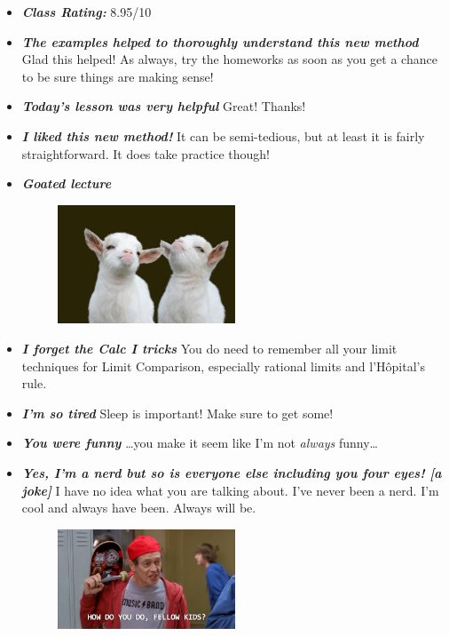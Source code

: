 \documentclass[11pt,letterpaper]{article}
\begin{document}
\begin{itemize}
\item {\bfseries\itshape Class Rating:} 8.95/10

\item {\bfseries\itshape The examples helped to thoroughly understand this new method} Glad this helped! As always, try the homeworks as soon as you get a chance to be sure things are making sense!

\item {\bfseries\itshape Today's lesson was very helpful} Great! Thanks!

\item {\bfseries\itshape I liked this new method!} It can be semi-tedious, but at least it is fairly straightforward. It does take practice though!

\item {\bfseries\itshape Goated lecture} 
	\begin{figure}[H]
	\centering
	\includegraphics[width=0.5\textwidth]{images/goat.jpg}
	\end{figure}

\item {\bfseries\itshape I forget the Calc I tricks} You do need to remember all your limit techniques for Limit Comparison, especially rational limits and l'H\^opital's rule.

\item {\bfseries\itshape I'm so tired} Sleep is important! Make sure to get some!

\item {\bfseries\itshape You were funny} \dots you make it seem like I'm not \textit{always} funny\dots

\item {\bfseries\itshape Yes, I'm a nerd but so is everyone else including you four eyes! [a joke]} I have no idea what you are talking about. I've never been a nerd. I'm cool and always have been. Always will be. 
	\begin{figure}[H]
	\centering
	\includegraphics[width=0.5\textwidth]{images/kids.jpg}
	\end{figure}


\end{itemize}
\end{document}
